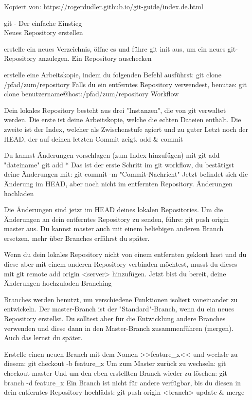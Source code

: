 \documentclass[11pt]{article}
\begin{document}
Kopiert von: \url{https://rogerdudler.github.io/git-guide/index.de.html}

\Large{git - Der einfache Einstieg} \\

Neues Repository erstellen

erstelle ein neues Verzeichnis, öffne es und führe
git init
aus, um ein neues git-Repository anzulegen.
Ein Repository auschecken

erstelle eine Arbeitskopie, indem du folgenden Befehl ausführst:
git clone /pfad/zum/repository
Falls du ein entferntes Repository verwendest, benutze:
git clone benutzername@host:/pfad/zum/repository
Workflow

Dein lokales Repository besteht aus drei "Instanzen", die von git verwaltet werden. Die erste ist deine Arbeitskopie, welche die echten Dateien enthält. Die zweite ist der Index, welcher als Zwischenstufe agiert und zu guter Letzt noch der HEAD, der auf deinen letzten Commit zeigt.
add \& commit

Du kannst Änderungen vorschlagen (zum Index hinzufügen) mit
git add "dateiname"
git add *
Das ist der erste Schritt im git workflow, du bestätigst deine Änderungen mit:
git commit -m "Commit-Nachricht"
Jetzt befindet sich die Änderung im HEAD, aber noch nicht im entfernten Repository.
Änderungen hochladen

Die Änderungen sind jetzt im HEAD deines lokalen Repositories. Um die Änderungen an dein entferntes Repository zu senden, führe:
git push origin master
aus. Du kannst master auch mit einem beliebigen anderen Branch ersetzen, mehr über Branches erfährst du später.

Wenn du dein lokales Repository nicht von einem entfernten geklont hast und du diese aber mit einem anderen Repository verbinden möchtest, musst du dieses mit
git remote add origin <server>
hinzufügen. Jetzt bist du bereit, deine Änderungen hochzuladen
Branching

Branches werden benutzt, um verschiedene Funktionen isoliert voneinander zu entwickeln. Der master-Branch ist der "Standard"-Branch, wenn du ein neues Repository erstellst. Du solltest aber für die Entwicklung andere Branches verwenden und diese dann in den Master-Branch zusammenführen (mergen). Auch das lernst du später.

Erstelle einen neuen Branch mit dem Namen >>feature\_x<< und wechsle zu diesem:
git checkout -b feature\_x
Um zum Master zurück zu wechseln:
git checkout master
Und um den eben erstellten Branch wieder zu löschen:
git branch -d feature\_x
Ein Branch ist nicht für andere verfügbar, bis du diesen in dein entferntes Repository hochlädst:
git push origin <branch>
update \& merge
\end{document}
